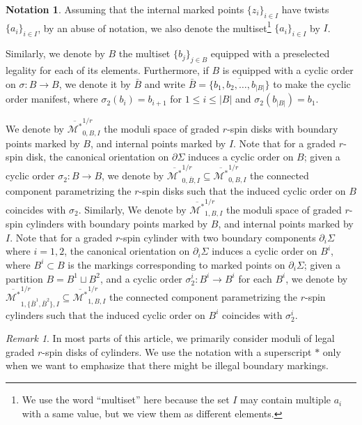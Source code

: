 \documentclass[11pt]{amsart}
\theoremstyle{definition}
\newtheorem{nn}[dummy]{Notation}
\theoremstyle{remark}
\newtheorem{rmk}[dummy]{Remark}
\newcommand{\<}{\left<}
\renewcommand{\>}{\right>}
\numberwithin{equation}{section}
\def\Mbarstar{{\overline{\mathcal M^*}}}
\begin{document}
\begin{nn}
    Assuming that the internal marked points $\{z_i\}_{i\in I}$ have twists $\{a_i\}_{i\in I}$, by an abuse of notation, we also denote the multiset\footnote{We use the word ``multiset'' here because the set $I$ may contain multiple $a_i$ with a same value, but we view them as different elements.} $\{a_i\}_{i\in I}$ by $I$.
    
Similarly, we denote by $B$ the multiset $\{b_j\}_{j\in B}$ equipped with a preselected legality for each of its elements. Furthermore, if $B$ is equipped with a cyclic order on $\sigma\colon B\to B$, we denote it by $\bar B$ and write $\bar{B}=\overline{\{b_1,b_2,\dots,b_{\lvert B \rvert}\}}$ to make the cyclic order manifest, where $\sigma_2(b_i)=b_{i+1}$ for $1\le i \le \lvert B \rvert$ and $\sigma_2(b_{\lvert B \rvert})=b_{1}$.
\end{nn}



We denote by $\Mbarstar_{0,B,I}^{1/r}$ the moduli space of graded $r$-spin disks with boundary points marked by $B$, and internal points marked by $I$. Note that for a graded $r$-spin disk, the canonical orientation on $\partial\Sigma$ induces a cyclic order on $B$; given a cyclic order $\sigma_2\colon B \to B$, we denote by $\Mbarstar_{0,\bar{B},I}^{1/r}\subseteq \Mbarstar_{0,{B},I}^{1/r}$ the connected component parametrizing the $r$-spin disks such that the induced cyclic order on $B$ coincides with $\sigma_2$. 
Similarly, We denote by $\Mbarstar_{1,B,I}^{1/r}$ the moduli space of graded $r$-spin cylinders with boundary points marked by $B$, and internal points marked by $I$. Note that for a graded $r$-spin cylinder with two boundary components $\partial_i\Sigma$ where $i=1,2$, the canonical orientation on $\partial_i\Sigma$ induces a cyclic order on $B^i$, where $B^i\subset B$ is the markings corresponding to marked points on $\partial_i\Sigma$; given a partition $B=B^1\sqcup B^2$, and a cyclic order $\sigma_2^i\colon B^i \to B^i$ for each $B^i$, we denote by $\Mbarstar_{1,\{\bar{B}^1,\bar B^2\},I}^{1/r}\subseteq \Mbarstar_{1,{B},I}^{1/r}$ the connected component parametrizing the $r$-spin cylinders such that the induced cyclic order on $B^i$ coincides with $\sigma^i_2$. 


\begin{rmk}
   In most parts of this article, we primarily consider moduli of legal graded $r$-spin disks of cylinders. We use the notation with a superscript $*$ only when we want to emphasize that there might be illegal boundary markings. 
\end{rmk}
\end{document}
